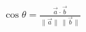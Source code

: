 \documentclass[preview]{standalone}
\begin{document}
\begin{align*}
\cos \theta = \frac{ \vec a \cdot \vec b }{\lVert \vec a \rVert \, \lVert \vec b \rVert}
\end{align*}
\end{document}
